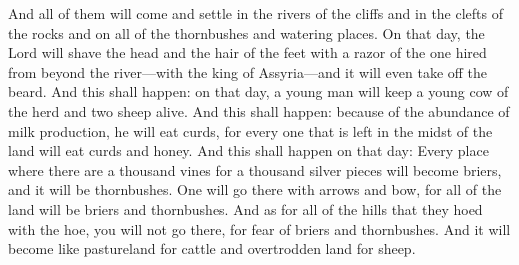 \begin{biblechapter}
\verse And all of them will come and settle in the rivers of the cliffs and in the clefts of the rocks and on all of the thornbushes and watering places.
\verse On that day, the Lord will shave the head and the hair of the feet with a razor of the one hired from beyond the river—with the king of Assyria—and it will even take off the beard.
\verse And this shall happen: on that day, a young man will keep a young cow of the herd and two sheep alive.
\verse And this shall happen: because of the abundance of milk production, he will eat curds, for every one that is left in the midst of the land will eat curds and honey.
\verse And this shall happen on that day: Every place where there are a thousand vines for a thousand silver pieces will become briers, and it will be thornbushes.
\verse One will go there with arrows and bow, for all of the land will be briers and thornbushes.
\verse And as for all of the hills that they hoed with the hoe, you will not go there, for fear of briers and thornbushes. And it will become like pastureland for cattle and overtrodden land for sheep.
\end{biblechapter}


